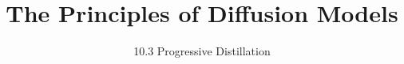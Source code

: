 
\title{The Principles of Diffusion Models}
\subtitle{10.3 Progressive Distillation}


\begin{frame}
    \titlepage
\end{frame}


